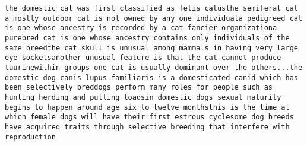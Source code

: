 \texttt{the domestic cat was first classified as felis catus\newline the semiferal cat a mostly outdoor cat is not owned by any one individual\newline a pedigreed cat is one whose ancestry is recorded by a cat fancier organization\newline a purebred cat is one whose ancestry contains only individuals of the same breed\newline the cat skull is unusual among mammals in having very large eye sockets\newline another unusual feature is that the cat cannot produce taurine\newline within groups one cat is usually dominant over the others\newline ...\newline the domestic dog canis lupus familiaris is a domesticated canid which has been selectively bred\newline dogs perform many roles for people such as hunting herding and pulling loads\newline in domestic dogs sexual maturity begins to happen around age six to twelve months\newline this is the time at which female dogs will have their first estrous cycle\newline some dog breeds have acquired traits through selective breeding that interfere with reproduction}